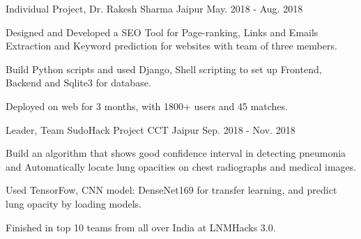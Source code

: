 \begin{cventries}
  \cventry
  {Individual Project, Dr. Rakesh Sharma}
  {}
  {Jaipur}
  {May. 2018 - Aug. 2018}
  {
    \begin{cvitems}
      \item Designed and Developed a SEO Tool for Page-ranking, Links and Emails 
        Extraction and Keyword prediction for websites with team of three members.
      \item Build Python scripts and used Django, Shell scripting to set up Frontend, Backend
        and Sqlite3 for database.
      \item Deployed on web for 3 months, with 1800+ users and 45 matches.
    \end{cvitems}
  }

  \cventry
  {Leader, Team SudoHack Project}
  {\href{https://github.com/LNMHacks/LNMHacks-3.0-Submission/sudo hack}{}}
  {CCT Jaipur}
  {Sep. 2018 - Nov. 2018}
  {
    \begin{cvitems}
      \item Build an algorithm that shows good confidence interval in detecting pneumonia
        and Automatically locate lung opacities on chest radiographs and medical images. 
      \item Used TensorFow, CNN model: DenseNet169 for transfer learning,
        and predict lung opacity by loading models.
      \item Finished in top 10 teams from all over India at LNMHacks 3.0.
    \end{cvitems}
  }
 


\end{cventries}

